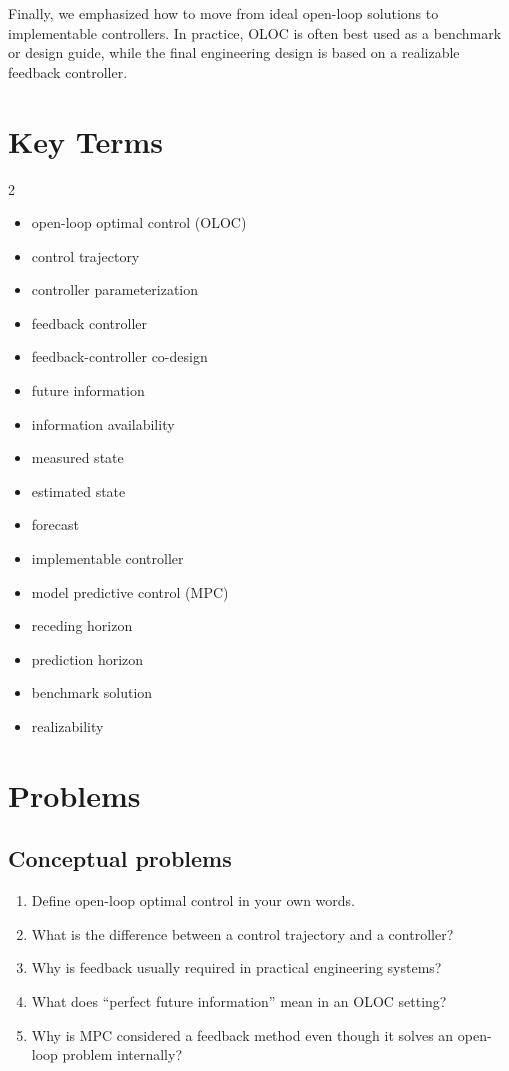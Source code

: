 \documentclass[11pt]{article}
\begin{document}
Finally, we emphasized how to move from ideal open-loop solutions to implementable controllers. In practice, OLOC is often best used as a benchmark or design guide, while the final engineering design is based on a realizable feedback controller.

\section{Key Terms}

\begin{multicols}{2}
\begin{itemize}[leftmargin=1.4em,itemsep=0.25em]
  \item open-loop optimal control (OLOC)
  \item control trajectory
  \item controller parameterization
  \item feedback controller
  \item feedback-controller co-design
  \item future information
  \item information availability
  \item measured state
  \item estimated state
  \item forecast
  \item implementable controller
  \item model predictive control (MPC)
  \item receding horizon
  \item prediction horizon
  \item benchmark solution
  \item realizability
\end{itemize}
\end{multicols}

\section{Problems}

\subsection*{Conceptual problems}
\begin{enumerate}[leftmargin=1.5em,label=\textbf{P\arabic*.}]
  \item Define open-loop optimal control in your own words.
  \item What is the difference between a control trajectory and a controller?
  \item Why is feedback usually required in practical engineering systems?
  \item What does ``perfect future information'' mean in an OLOC setting?
  \item Why is MPC considered a feedback method even though it solves an open-loop problem internally?
\end{enumerate}
\end{document}
